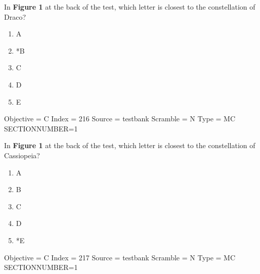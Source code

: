 \documentclass[11pt]{article}
\begin{document}
\begin{enumerate}
\begin{minipage}{\textwidth}
\begin{minipage}{\textwidth}
\item In {\bf Figure 1} at the back of the test, which letter is closest to the constellation of Draco?
\begin{multicols}{3}
\begin{enumerate} 
\setlength{\itemsep}{1pt} 
\setlength{\parskip}{0pt} 
\setlength{\parsep}{0pt}
\setlength{\multicolsep}{1pt} 
\item A
\item *B
\item C
\item D
\item E
\end{enumerate} 
\vfill 
\end{multicols}

Objective = C
Index = 216
Source = testbank
Scramble = N
Type = MC
SECTIONNUMBER=1
\end{minipage}
\end{minipage}
\vskip 0.20in

\begin{minipage}{\textwidth}
\begin{minipage}{\textwidth}
\item In {\bf Figure 1} at the back of the test, which letter is closest to the constellation of  Cassiopeia?
\begin{multicols}{3}
\begin{enumerate} 
\setlength{\itemsep}{1pt} 
\setlength{\parskip}{0pt} 
\setlength{\parsep}{0pt}
\setlength{\multicolsep}{1pt} 
\item A
\item B
\item C
\item D
\item *E
\end{enumerate} 
\vfill 
\end{multicols}

Objective = C
Index = 217
Source = testbank
Scramble = N
Type = MC
SECTIONNUMBER=1
\end{minipage}
\end{minipage}
\vskip 0.20in

\end{enumerate}
\end{document}
